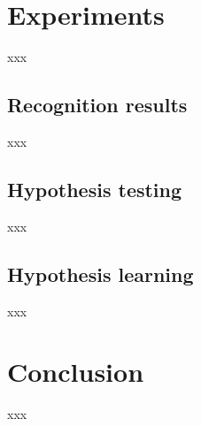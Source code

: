 \documentclass[10pt,twocolumn,letterpaper]{article}
\begin{document}
\section{Experiments}
xxx

\subsection{Recognition results}
xxx

\subsection{Hypothesis testing}
xxx

\subsection{Hypothesis learning}
xxx

\section{Conclusion}
xxx

{\small


}
\end{document}
